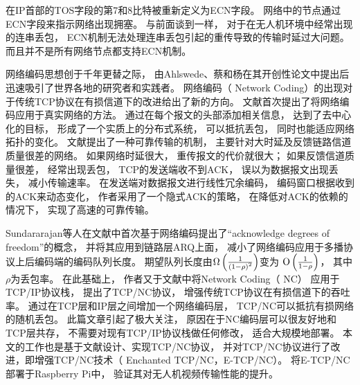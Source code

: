在IP首部的TOS字段的第7和8比特被重新定义为ECN字段。
网络中的节点通过ECN字段来指示网络出现拥塞。
与前面谈到一样，
对于在无人机环境中经常出现的连串丢包，
ECN机制无法处理连串丢包引起的重传导致的传输时延过大问题。
而且并不是所有网络节点都支持ECN机制。
\par
网络编码思想创于千年更替之际，
由Ahlswede、蔡和杨在其开创性论文\cite{Ahlswede2000}中提出后迅速吸引了世界各地的研究者和实践者。
网络编码（ Network Coding）的出现对于传统TCP协议在有损信道下的改进给出了新的方向。
文献\cite{chou2003practical}首次提出了将网络编码应用于真实网络的方法。
通过在每个报文的头部添加相关信息，
达到了去中心化的目标，
形成了一个实质上的分布式系统，
可以抵抗丢包，
同时也能适应网络拓扑的变化。
文献\cite{ontheflycoding}提出了一种可靠传输的机制，
主要针对大时延及反馈链路信道质量很差的网络。
如果网络时延很大，
重传报文的代价就很大；
如果反馈信道质量很差，
经常出现丢包，
TCP的发送端收不到ACK，
误以为数据报文出现丢失，
减小传输速率。
在发送端对数据报文进行线性冗余编码，
编码窗口根据收到的ACK来动态变化，
作者采用了一个隐式ACK的策略，
在降低对ACK的依赖的情况下，
实现了高速的可靠传输。
\par
Sundararajan等人在文献\cite{4595268}中首次基于网络编码提出了“acknowledge degrees of freedom”的概念，
并将其应用到链路层ARQ上面，
减小了网络编码应用于多播协议上后编码端的编码队列长度。
期望队列长度由$\Omega \left( {\frac{1}{{{{\left( {1{\rm{ - }}\rho } \right)}^2}}}} \right)$变为
${\rm O}\left( {\frac{1}{{1{\rm{ - }}\rho }}} \right)$，
其中$\rho$为丢包率。
在此基础上，
作者又于文献\cite{Sundararajan2009}中将Network Coding（ NC） 应用于TCP/IP协议栈，
提出了TCP/NC协议，
增强传统TCP协议在有损信道下的吞吐率。
通过在TCP层和IP层之间增加一个网络编码层，
TCP/NC可以抵抗有损网络的随机丢包。
此篇文章引起了极大关注，
原因在于NC编码层可以很友好地和TCP层共存，
不需要对现有TCP/IP协议栈做任何修改，
适合大规模地部署。
本文的工作也是基于文献\cite{Sundararajan2009,Sundararajan2011}设计、实现TCP/NC协议，
并对TCP/NC协议进行了改进，即增强TCP/NC技术（ Enchanted TCP/NC，E-TCP/NC）。
将E-TCP/NC部署于Raspberry Pi中，
验证其对无人机视频传输性能的提升。

